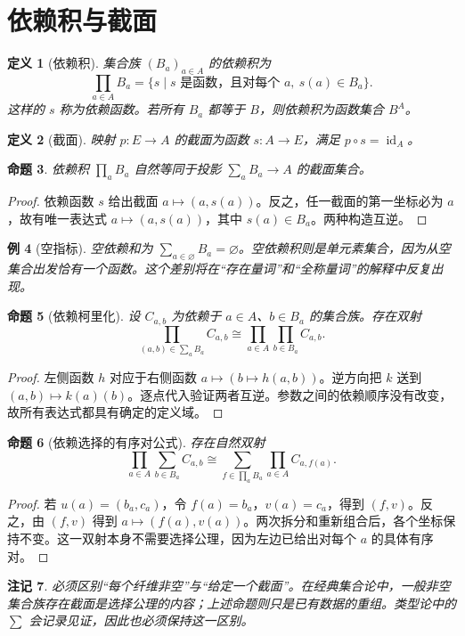 \documentclass[12pt,oneside,openany,fontset=none]{ctexbook}
\theoremstyle{cn}
\newtheorem{definition}{定义}[chapter]
\newtheorem{example}[definition]{例}
\newtheorem{proposition}[definition]{命题}
\newtheorem{remark}[definition]{注记}
\numberwithin{equation}{chapter}
\newcommand{\id}{\operatorname{id}}
\begin{document}
\section{依赖积与截面}
\begin{definition}[依赖积]
集合族 $(B_a)_{a\in A}$ 的依赖积为
\[
\prod_{a\in A}B_a
=\{s\mid s\text{ 是函数，且对每个 }a,\ s(a)\in B_a\}.
\]
这样的 $s$ 称为依赖函数。若所有 $B_a$ 都等于 $B$，则依赖积为函数集合 $B^A$。
\end{definition}
\begin{definition}[截面]
映射 $p:E\to A$ 的截面为函数 $s:A\to E$，满足 $p\circ s=\id_A$。
\end{definition}
\begin{proposition}
依赖积 $\prod_a B_a$ 自然等同于投影 $\sum_a B_a\to A$ 的截面集合。
\end{proposition}
\begin{proof}
依赖函数 $s$ 给出截面 $a\mapsto(a,s(a))$。反之，任一截面的第一坐标必为 $a$，故有唯一表达式 $a\mapsto(a,s(a))$，其中 $s(a)\in B_a$。两种构造互逆。
\end{proof}
\begin{example}[空指标]
空依赖和为 $\sum_{a\in\varnothing}B_a=\varnothing$。空依赖积则是单元素集合，因为从空集合出发恰有一个函数。这个差别将在“存在量词”和“全称量词”的解释中反复出现。
\end{example}
\begin{proposition}[依赖柯里化]
设 $C_{a,b}$ 为依赖于 $a\in A$、$b\in B_a$ 的集合族。存在双射
\[
\prod_{(a,b)\in\sum_aB_a}C_{a,b}
\cong \prod_{a\in A}\prod_{b\in B_a}C_{a,b}.
\]
\end{proposition}
\begin{proof}
左侧函数 $h$ 对应于右侧函数 $a\mapsto(b\mapsto h(a,b))$。逆方向把 $k$ 送到 $(a,b)\mapsto k(a)(b)$。逐点代入验证两者互逆。参数之间的依赖顺序没有改变，故所有表达式都具有确定的定义域。
\end{proof}
\begin{proposition}[依赖选择的有序对公式]
存在自然双射
\[
\prod_{a\in A}\sum_{b\in B_a}C_{a,b}
\cong
\sum_{f\in\prod_a B_a}\prod_{a\in A} C_{a,f(a)}.
\]
\end{proposition}
\begin{proof}
若 $u(a)=(b_a,c_a)$，令 $f(a)=b_a$，$v(a)=c_a$，得到 $(f,v)$。反之，由 $(f,v)$ 得到 $a\mapsto(f(a),v(a))$。两次拆分和重新组合后，各个坐标保持不变。这一双射本身不需要选择公理，因为左边已给出对每个 $a$ 的具体有序对。
\end{proof}
\begin{remark}
必须区别“每个纤维非空”与“给定一个截面”。在经典集合论中，一般非空集合族存在截面是选择公理的内容；上述命题则只是已有数据的重组。类型论中的 $\sum$ 会记录见证，因此也必须保持这一区别。
\end{remark}
\end{document}
